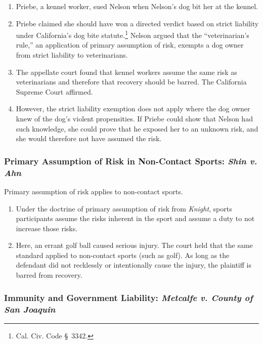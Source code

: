 \begin{enumerate}
    \item Priebe, a kennel worker, sued Nelson when Nelson's dog bit her at 
    the kennel.
    \item Priebe claimed she should have won a directed verdict based on 
    strict liability under California's dog bite statute.\footnote{Cal. Civ. 
    Code \S\ 3342.} Nelson argued that the ``veterinarian's rule,'' an 
    application of primary assumption of risk, exempts a dog owner from strict 
    liability to veterinarians.
    \item The appellate court found that kennel workers assume the same risk 
    as veterinarians and therefore that recovery should be barred. The 
    California Supreme Court affirmed.
    \item However, the strict liability exemption does not apply where the dog 
    owner knew of the dog's violent propensities. If Priebe could show that 
    Nelson had such knowledge, she could prove that he exposed her to an 
    unknown risk, and she would therefore not have assumed the risk.
\end{enumerate}

\subsubsection{Primary Assumption of Risk in Non-Contact Sports: \emph{Shin v. Ahn}}

Primary assumption of risk applies to non-contact sports.

\begin{enumerate}
    \item Under the doctrine of primary assumption of risk from \emph{Knight}, 
    sports participants assume the risks inherent in the sport and assume a 
    duty to not increase those risks.
    \item Here, an errant golf ball caused serious injury. The court held that 
    the same standard applied to non-contact sports (such as golf). As long as 
    the defendant did not recklessly or intentionally cause the injury, the 
    plaintiff is barred from recovery.
\end{enumerate}

\subsubsection{Immunity and Government Liability: \emph{Metcalfe v. County of 
San Joaquin}}

